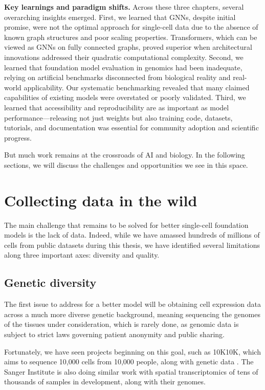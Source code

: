 \textbf{Key learnings and paradigm shifts.} Across these three chapters, several overarching insights emerged. First, we learned that \gls{GNN}s, despite initial promise, were not the optimal approach for single-cell data due to the absence of known graph structures and poor scaling properties. Transformers, which can be viewed as \gls{GNN}s on fully connected graphs, proved superior when architectural innovations addressed their quadratic computational complexity. Second, we learned that foundation model evaluation in genomics had been inadequate, relying on artificial benchmarks disconnected from biological reality and real-world applicability. Our systematic benchmarking revealed that many claimed capabilities of existing models were overstated or poorly validated. Third, we learned that accessibility and reproducibility are as important as model performance---releasing not just weights but also training code, datasets, tutorials, and documentation was essential for community adoption and scientific progress.

But much work remains at the crossroads of AI and biology. In the following sections, we will discuss the challenges and opportunities we see in this space.

\section{Collecting data in the wild}

The main challenge that remains to be solved for better single-cell foundation models is the lack of data. Indeed, while we have amassed hundreds of millions of cells from public datasets during this thesis, we have identified several limitations along three important axes: diversity and quality.

\subsection{Genetic diversity}

The first issue to address for a better model will be obtaining cell expression data across a much more diverse genetic background, meaning sequencing the genomes of the tissues under consideration, which is rarely done, as genomic data is subject to strict laws governing patient anonymity and public sharing.

Fortunately, we have seen projects beginning on this goal, such as 10K10K, which aims to sequence 10,000 cells from 10,000 people, along with genetic data \cite{cuomoImpactRareCommon2025}. The Sanger Institute is also doing similar work with spatial transcriptomics of tens of thousands of samples in development, along with their genomes.

